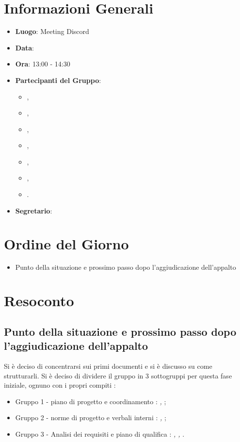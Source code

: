 \section{Informazioni Generali}

\begin{itemize}
\item{\textbf{Luogo}}: Meeting Discord
\item{\textbf{Data}}: \D{}
\item{\textbf{Ora}}: 13:00 - 14:30
\item{\textbf{Partecipanti del Gruppo}}: 
	\begin{itemize}
	\item{\EP{},} 
	\item{\FP{},}
	\item{\GC{},}
	\item{\LW{},}
	\item{\MB{},}
	\item{\MG{},}
	\item{\PV{}.}
	\end{itemize} 
\item{\textbf{Segretario}}: \PV{}	
\end{itemize}

\section{Ordine del Giorno}
\begin{itemize}
\item{Punto della situazione e prossimo passo dopo l'aggiudicazione dell'appalto}
\end{itemize}

\section{Resoconto}

\subsection{Punto della situazione e prossimo passo dopo l'aggiudicazione dell'appalto}

Si è deciso di concentrarsi sui primi documenti e si è discusso su come strutturarli. Si è deciso di dividere il gruppo in 3 sottogruppi per questa fase iniziale, ognuno con i propri compiti : 

\begin{itemize}
\item{Gruppo 1 - piano di progetto e coordinamento : \textit{\EP{}, \MB{}};}
\item{Gruppo 2 - norme di progetto e verbali interni : \textit{\PV{}, \MG{}};}
\item{Gruppo 3 - Analisi dei requisiti e piano di qualifica : \textit{\FP{}, \GC{}, \LW{}}.}
\end{itemize}

